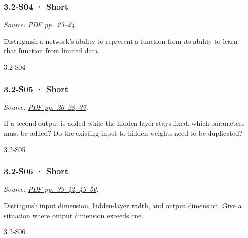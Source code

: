 \noindent\begin{minipage}{\linewidth}

\subsubsection{3.2-S04 · Short}\label{s04-short-8}

\emph{Source:
\href{../Lecture\%20Slides/3.2.\%20Shallow\%20NN.pdf\#page=23}{PDF
pp.~23--24}.}

Distinguish a network's ability to represent a function from its ability
to learn that function from limited data.

\begin{solution}[20mm]{3.2-S04}

\end{solution}
\end{minipage}\par\medskip

\noindent\begin{minipage}{\linewidth}

\subsubsection{3.2-S05 · Short}\label{s05-short-8}

\emph{Source:
\href{../Lecture\%20Slides/3.2.\%20Shallow\%20NN.pdf\#page=26}{PDF
pp.~26--28, 37}.}

If a second output is added while the hidden layer stays fixed, which
parameters must be added? Do the existing input-to-hidden weights need
to be duplicated?

\begin{solution}[20mm]{3.2-S05}

\end{solution}
\end{minipage}\par\medskip

\noindent\begin{minipage}{\linewidth}

\subsubsection{3.2-S06 · Short}\label{s06-short-8}

\emph{Source:
\href{../Lecture\%20Slides/3.2.\%20Shallow\%20NN.pdf\#page=39}{PDF
pp.~39--42, 49--50}.}

Distinguish input dimension, hidden-layer width, and output dimension.
Give a situation where output dimension exceeds one.

\begin{solution}[20mm]{3.2-S06}

\end{solution}
\end{minipage}\par\medskip

